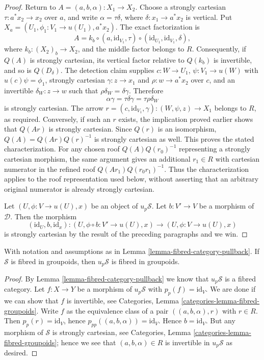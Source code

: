 \begin{proof}
\medskip\noindent
Return to $A = (a,b,\alpha) : X_1 \to X_2$.
Choose a strongly cartesian $\tau : a^*x_2 \to x_2$ over $a$, and
write $\alpha = \tau\delta$, where $\delta : x_1 \to a^*x_2$ is vertical.
Put $X_a = (U_1,\phi_1 : V_1 \to u(U_1),a^*x_2)$.
The exact factorization is
$$
A = k_b \circ (a,\text{id}_{V_1},\tau)
\circ (\text{id}_{U_1},\text{id}_{V_1},\delta),
$$
where $k_b : (X_2)_b \to X_2$, and the middle factor belongs to $R$.
Consequently, if $Q(A)$ is strongly cartesian, its vertical factor
relative to $Q(k_b)$ is invertible, and so is $Q(D_\delta)$.
The detection claim supplies $c : W \to U_1$, $\psi : V_1 \to u(W)$
with $u(c)\psi = \phi_1$, strongly cartesian
$\gamma : z \to x_1$ and $\rho : w \to a^*x_2$ over $c$, and an
invertible $\delta_W : z \to w$ such that
$\rho\delta_W = \delta\gamma$.
Therefore
$$
\alpha\gamma = \tau\delta\gamma = \tau\rho\delta_W
$$
is strongly cartesian. The arrow
$r = (c,\text{id}_{V_1},\gamma) : (W,\psi,z) \to X_1$
belongs to $R$, as required.
Conversely, if such an $r$ exists, the implication proved earlier
shows that $Q(Ar)$ is strongly cartesian. Since $Q(r)$ is an
isomorphism, $Q(A) = Q(Ar)Q(r)^{-1}$ is strongly cartesian as well.
This proves the stated characterization.
For any chosen roof $Q(A)Q(r_0)^{-1}$ representing a strongly
cartesian morphism, the same argument gives an additional $r_1 \in R$
with cartesian numerator in the refined roof
$Q(Ar_1)Q(r_0r_1)^{-1}$. Thus the characterization applies to the
roof representation used below, without asserting that an arbitrary
original numerator is already strongly cartesian.

\medskip\noindent
Let $(U, \phi : V \to u(U), x)$ be an object of $u_p\mathcal{S}$.
Let $b : V' \to V$ be a morphism of $\mathcal{D}$. Then the morphism
$$
(\text{id}_U, b, \text{id}_x) :
(U, \phi \circ b : V' \to u(U), x)
\longrightarrow
(U, \phi : V \to u(U), x)
$$
is strongly cartesian by the result of the preceding paragraphs and we win.
\end{proof}

\begin{lemma}
\label{lemma-fibred-groupoids-category-pullback}
With notation and assumptions as in
Lemma \ref{lemma-fibred-category-pullback}.
If $\mathcal{S}$ is fibred in groupoids, then $u_p\mathcal{S}$ is fibred
in groupoids.
\end{lemma}

\begin{proof}
By
Lemma \ref{lemma-fibred-category-pullback}
we know that $u_p\mathcal{S}$ is a fibred category.
Let $f : X \to Y$ be a morphism of $u_p\mathcal{S}$ with
$p_p(f) = \text{id}_V$. We are done if we can show that $f$ is invertible, see
Categories, Lemma \ref{categories-lemma-fibred-groupoids}.
Write $f$ as the equivalence class of
a pair $((a, b, \alpha), r)$ with $r \in R$. Then $p_p(r) = \text{id}_V$,
hence $p_{pp}((a, b, \alpha)) = \text{id}_V$. Hence $b = \text{id}_V$.
But any morphism of $\mathcal{S}$ is strongly cartesian, see
Categories, Lemma \ref{categories-lemma-fibred-groupoids};
hence we see that $(a, b, \alpha) \in R$ is invertible
in $u_p\mathcal{S}$ as desired.
\end{proof}

